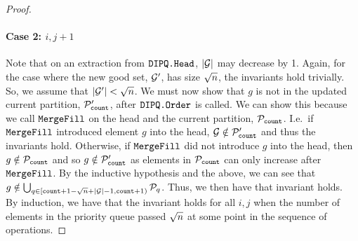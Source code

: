 \begin{proof}

\paragraph*{Case 2: $i, j + 1$} Note that on an extraction from $\texttt{DIPQ.Head}$, $|\mathcal{G}|$ may decrease by 1.
Again, for the case where the new good set, $\mathcal{G}'$, has size ${\sqrt{n}}$, the invariants hold trivially.
So, we assume that $|\mathcal{G}'| < {\sqrt{n}}$.
We must now show that $g$ is not in the updated current partition, $\mathcal{P}'_{\texttt{count}}$, after $\texttt{DIPQ.Order}$ is called.
We can show this because we call $\texttt{MergeFill}$ on the head and the current partition, $\mathcal{P}_{\texttt{count}}$. I.e.\ if $\texttt{MergeFill}$ introduced element $g$
into the head, $\mathcal{G} \notin \mathcal{P}'_{\texttt{count}}$ and thus the invariants hold. Otherwise, if $\texttt{MergeFill}$ did not introduce $g$ into the head, then $g \notin \mathcal{P}_{\texttt{count}}$ and so $g \notin \mathcal{P}'_{\texttt{count}}$
as elements in $\mathcal{P}_{\texttt{count}}$ can only increase after $\texttt{MergeFill}$.
By the inductive hypothesis and the above, we can see that $g \notin \bigcup_{q \in [{\texttt{count}} + 1 - {\sqrt{n}} + |\mathcal{G}| - 1, {\texttt{count}} + 1)} \mathcal{P}_q$. Thus, we then have that invariant holds.\\


By induction, we have that the invariant holds for all $i, j$ when the number of elements in the priority queue passed ${\sqrt{n}}$ at some point in the sequence of operations.
\end{proof}

